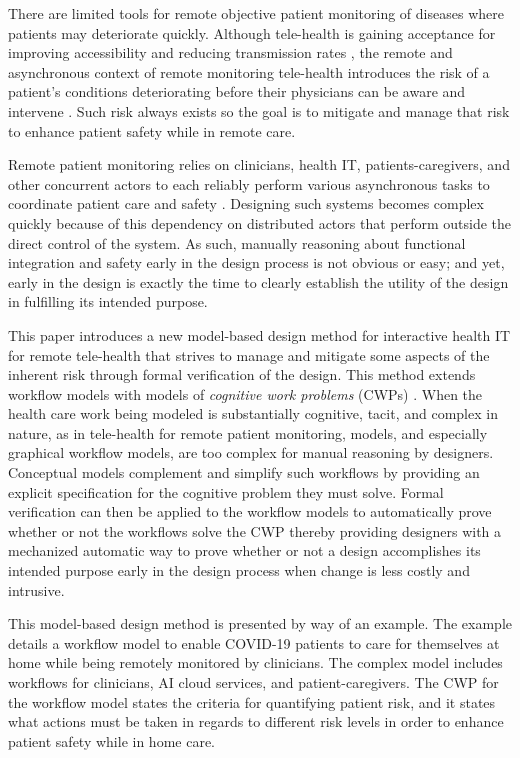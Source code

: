 There are limited tools for remote objective patient monitoring of diseases where patients may deteriorate quickly. Although tele-health is gaining acceptance for improving accessibility and reducing transmission rates \cite{10.1093/jamia/ocaa048,telehealth,10.1093/jamia/ocaa067}, the remote and asynchronous context of remote monitoring tele-health introduces the risk of a patient's conditions deteriorating before their physicians can be aware and intervene \cite{10.1097/ALN.0000000000003578}. Such risk always exists so the goal is to mitigate and manage that risk to enhance patient safety while in remote care. 

Remote patient monitoring relies on clinicians, health IT, patients-caregivers, and other concurrent actors to each reliably perform various asynchronous tasks to coordinate patient care and safety \cite{remote,Aalam229}. Designing such systems becomes complex quickly because of this dependency on distributed actors that perform outside the direct control of the system. As such, manually reasoning about functional integration and safety early in the design process is not obvious or easy; and yet, early in the design is exactly the time to clearly establish the utility of the design in fulfilling its intended purpose. 

This paper introduces a new model-based design method for interactive health IT for remote tele-health that strives to manage and mitigate some aspects of the inherent risk through formal verification of the design. This method extends workflow models with models of \emph{cognitive work problems} (CWPs) \cite{workflowmodel,workcentered,BERRY201615,chi2010}. When the health care work being modeled is substantially cognitive, tacit, and complex in nature, as in tele-health for remote patient monitoring, models, and especially graphical workflow models, are too complex for manual reasoning by designers. Conceptual models complement and simplify such workflows by providing an explicit specification for the cognitive problem they must solve. Formal verification can then be applied to the workflow models to automatically prove whether or not the workflows solve the CWP thereby providing designers with a mechanized automatic way to prove whether or not a design accomplishes its intended purpose early in the design process when change is less costly and intrusive.

This model-based design method is presented by way of an example. The example details a workflow model to enable COVID-19 patients to care for themselves at home while being remotely monitored by clinicians. The complex model includes workflows for clinicians, AI cloud services, and patient-caregivers. The CWP for the workflow model states the criteria for quantifying patient risk, and it states what actions must be taken in regards to different risk levels in order to enhance patient safety while in home care. 

